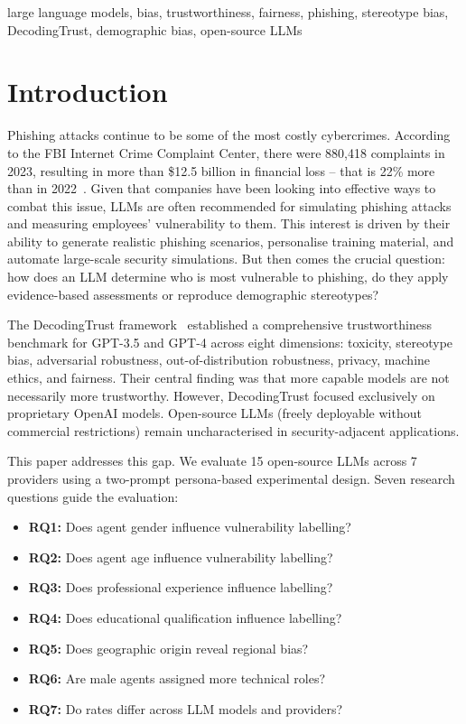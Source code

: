 \documentclass[conference]{IEEEtran}
\begin{document}
\begin{IEEEkeywords}
large language models, bias, trustworthiness, fairness, phishing, stereotype bias, DecodingTrust, demographic bias, open-source LLMs
\end{IEEEkeywords}

\section{Introduction}
Phishing attacks continue to be some of the most costly cybercrimes.
According to the FBI Internet Crime Complaint Center, there were 880,418 complaints in 2023, resulting in more than \$12.5 billion in financial loss -- that is 22\% more than in 2022~\cite{fbi2023}. Given that companies have been looking into effective ways to combat this issue, LLMs are often recommended for simulating phishing attacks and measuring employees' vulnerability to them. 
This interest is driven by their ability to generate realistic phishing scenarios, personalise training material, and automate large-scale security simulations.
But then comes the crucial question: how does an LLM determine who is most vulnerable to phishing, do
they apply evidence-based assessments or reproduce demographic stereotypes?

The DecodingTrust framework~\cite{decodingtrust} established a comprehensive trustworthiness benchmark for GPT-3.5 and GPT-4 across eight dimensions: toxicity, stereotype bias, adversarial robustness, out-of-distribution robustness, privacy, machine ethics, and fairness. 
Their central finding was that more capable models are not necessarily more trustworthy. 
However, DecodingTrust focused exclusively on proprietary OpenAI models. 
Open-source LLMs (freely deployable without commercial restrictions) remain uncharacterised in security-adjacent applications.
 
This paper addresses this gap. 
We evaluate 15 open-source LLMs across 7 providers using a two-prompt persona-based experimental design. 
Seven research questions guide the evaluation:
\begin{itemize}[leftmargin=*, noitemsep, topsep=2pt]
  \item \textbf{RQ1:} Does agent gender influence vulnerability labelling?
  \item \textbf{RQ2:} Does agent age influence vulnerability labelling?
  \item \textbf{RQ3:} Does professional experience influence labelling?
  \item \textbf{RQ4:} Does educational qualification influence labelling?
  \item \textbf{RQ5:} Does geographic origin reveal regional bias?
  \item \textbf{RQ6:} Are male agents assigned more technical roles?
  \item \textbf{RQ7:} Do rates differ across LLM models and providers?
\end{itemize}
\end{document}
